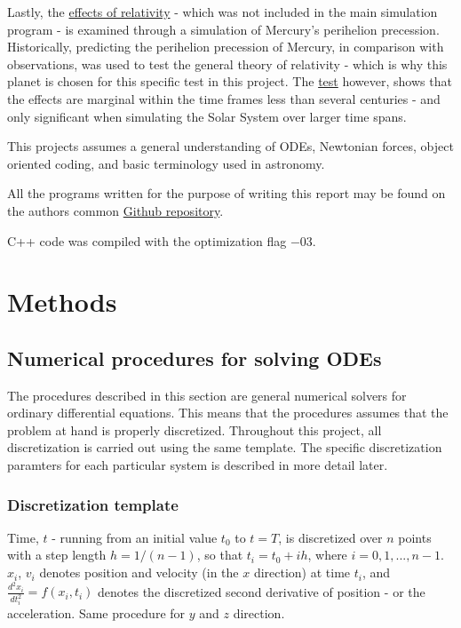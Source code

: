\documentclass[%
oneside,                 %
final,                   %
10pt]{article}
\begin{document}
Lastly, the \hyperref[sec:M.effectsofrel]{effects of relativity} - which was not included in the main simulation program - is examined through a simulation of Mercury's perihelion precession. Historically, predicting the perihelion precession of Mercury, in comparison with observations, was used to test the general theory of relativity - which is why this planet is chosen for this specific test in this project. The \hyperref[subsec:effofrel]{test} however, shows that the effects are marginal within the time frames less than several centuries - and only significant when simulating the Solar System over larger time spans. \newline

This projects assumes a general understanding of ODEs, Newtonian forces, object oriented coding, and basic terminology used in astronomy.  \newline

All the programs written for the purpose of writing this report may be found on the authors common \href{https://github.com/johanere/CP3}{Github repository}.\newline

C++ code was compiled with the optimization flag $-03$.


\section{Methods}

\subsection{Numerical procedures for solving ODEs}
\label{sec:NPs}
The procedures \cite{HJ-ODE} described in this section are general numerical solvers for ordinary differential equations. This means that the procedures assumes that the problem at hand is properly discretized.  Throughout this project, all discretization is carried out using the same template. The specific discretization paramters for each particular system is described in more detail later.  \newline

\subsubsection*{Discretization template}
Time, $t$ - running from an initial value $t_0$ to $t=T$,  is discretized over $n$ points with a step length $h=1/(n-1)$, so that $t_i=t_0 + ih$, where $i=0,1,...,n-1$. $x_i$, $v_i$ denotes position and velocity (in the $x$ direction) at time $t_i$, and $\frac{d^2x_i}{dt_i^2}=f(x_i,t_i)$ denotes the discretized second derivative of position - or the acceleration. Same procedure for $y$ and $z$ direction.
\end{document}
